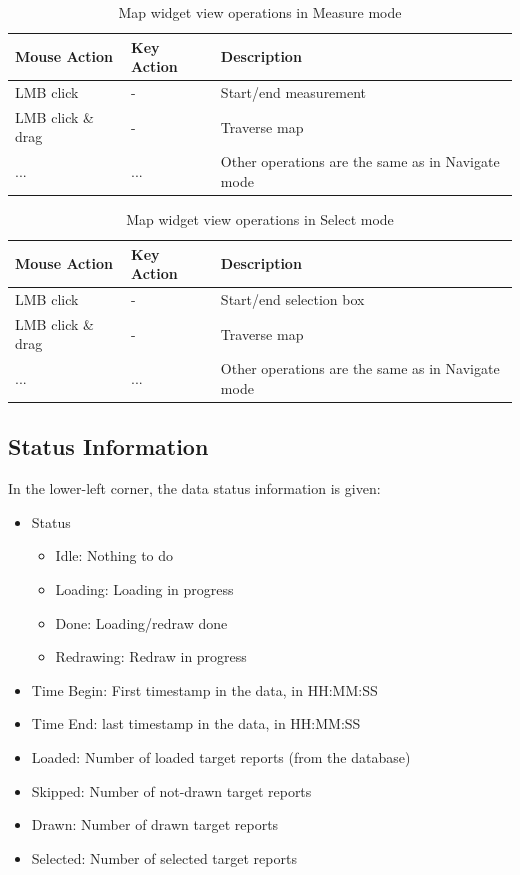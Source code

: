 \begin{table}[H]
  \center
  \begin{tabular}{ | l | l | l |}
    \hline
    \textbf{Mouse Action} & \textbf{Key Action} &  \textbf{Description} \\ \hline
    LMB click & - & Start/end measurement \\ \hline
    LMB click \& drag & - & Traverse map \\ \hline
    ... & ... & Other operations are the same as in Navigate mode \\ \hline  
    \end{tabular}
  \caption{Map widget view operations in Measure mode}
\end{table}

\begin{table}[H]
  \center
  \begin{tabular}{ | l | l | l |}
    \hline
    \textbf{Mouse Action} & \textbf{Key Action} &  \textbf{Description} \\ \hline
    LMB click & - & Start/end selection box \\ \hline
    LMB click \& drag & - & Traverse map \\ \hline
    ... & ... & Other operations are the same as in Navigate mode \\ \hline  
    \end{tabular}
  \caption{Map widget view operations in Select mode}
\end{table}

\subsection{Status Information}

In the lower-left corner, the data status information is given:

\begin{itemize}
 \item Status
\begin{itemize}
 \item Idle: Nothing to do
 \item Loading: Loading in progress
 \item Done: Loading/redraw done
 \item Redrawing: Redraw in progress
\end{itemize}
 \item Time Begin: First timestamp in the data, in HH:MM:SS
 \item Time End: last timestamp in the data, in HH:MM:SS
 \item Loaded: Number of loaded target reports (from the database)
 \item Skipped: Number of not-drawn target reports
 \item Drawn: Number of drawn target reports
 \item Selected: Number of selected target reports
\end{itemize}
\  \\

